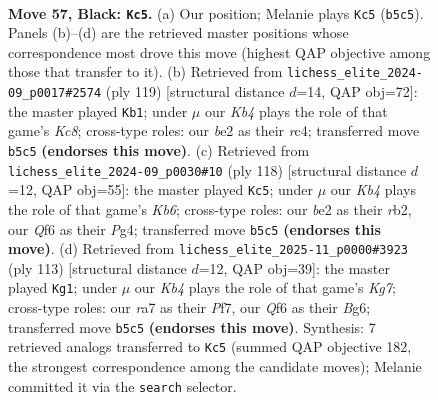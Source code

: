 \documentclass[11pt]{article}
\begin{document}
\clearpage

\begin{figure}[p]\centering
\begin{subfigure}{0.46\textwidth}\centering
\resizebox{\linewidth}{!}{%
\newchessgame
\chessboard[
  setfen={8/R7/5q2/1k6/1p6/b5K1/4B3/8 b - - 5 57},
  showmover=false,
  pgfstyle=straightmove, color=movearrow, markmove={b5-c5}
]}
\caption{}
\end{subfigure}\hfill
\begin{subfigure}{0.46\textwidth}\centering
\resizebox{\linewidth}{!}{%
\newchessgame
\chessboard[
  setfen={8/8/8/8/2R5/8/1p6/b1k1K3 b - - 9 60},
  showmover=false,
  pgfstyle=straightmove, color=movearrow, markmove={c1-b1}
]}
\caption{}
\end{subfigure}
\\[4pt]
\begin{subfigure}{0.46\textwidth}\centering
\resizebox{\linewidth}{!}{%
\newchessgame
\chessboard[
  setfen={7k/3B4/1K6/P7/6P1/8/1r6/8 w - - 3 60},
  showmover=false,
  pgfstyle=straightmove, color=movearrow, markmove={b6-c5}
]}
\caption{}
\end{subfigure}\hfill
\begin{subfigure}{0.46\textwidth}\centering
\resizebox{\linewidth}{!}{%
\newchessgame
\chessboard[
  setfen={8/5p2/6b1/8/8/7p/R5k1/4K3 b - - 0 57},
  showmover=false,
  pgfstyle=straightmove, color=movearrow, markmove={g2-g1}
]}
\caption{}
\end{subfigure}
\caption{\textbf{Move 57, Black: \texttt{Kc5}.} (a) Our position; Melanie plays \texttt{Kc5} (\texttt{b5c5}). Panels (b)--(d) are the retrieved master positions whose correspondence most drove this move (highest QAP objective among those that transfer to it). (b) Retrieved from \texttt{lichess\_elite\_2024-09\_p0017\#2574} (ply 119) [structural distance $d$=14, QAP obj=72]: the master played \texttt{Kb1}; under $\mu$ our \emph{Kb4} plays the role of that game's \emph{Kc8}; cross-type roles: our \emph{b}e2 as their \emph{r}c4; transferred move \texttt{b5c5} \textbf{(endorses this move)}. (c) Retrieved from \texttt{lichess\_elite\_2024-09\_p0030\#10} (ply 118) [structural distance $d$=12, QAP obj=55]: the master played \texttt{Kc5}; under $\mu$ our \emph{Kb4} plays the role of that game's \emph{Kb6}; cross-type roles: our \emph{b}e2 as their \emph{r}b2, our \emph{Q}f6 as their \emph{P}g4; transferred move \texttt{b5c5} \textbf{(endorses this move)}. (d) Retrieved from \texttt{lichess\_elite\_2025-11\_p0000\#3923} (ply 113) [structural distance $d$=12, QAP obj=39]: the master played \texttt{Kg1}; under $\mu$ our \emph{Kb4} plays the role of that game's \emph{Kg7}; cross-type roles: our \emph{r}a7 as their \emph{P}f7, our \emph{Q}f6 as their \emph{B}g6; transferred move \texttt{b5c5} \textbf{(endorses this move)}. Synthesis: 7 retrieved analogs transferred to \texttt{Kc5} (summed QAP objective 182, the strongest correspondence among the candidate moves); Melanie committed it via the \texttt{search} selector.}
\label{fig:thought-m113}
\end{figure}
\end{document}
